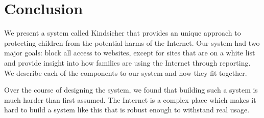 
\section{Conclusion}

We present a system called Kindsicher that provides an unique approach to
protecting children from the potential harms of the Internet. Our system had
two major goals: block all access to websites, except for sites that are on a
white list and provide insight into how families are using the Internet through
reporting. We describe each of the components to our system and how they fit
together.

Over the course of designing the system, we found that building such a system
is much harder than first assumed. The Internet is a complex place which makes
it hard to build a system like this that is robust enough to withstand real
usage.


